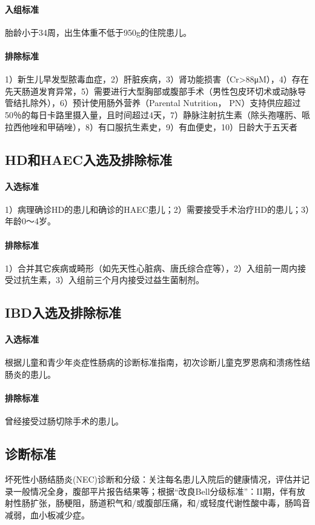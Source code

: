       \paragraph{入组标准}
      胎龄小于34周，出生体重不低于950g的住院患儿。
      \paragraph{排除标准}
      1）新生儿早发型脓毒血症，2）肝脏疾病，3）肾功能损害（Cr>88μM），4）存在先天肠道发育异常，5）需要进行大型胸部或腹部手术（男性包皮环切术或动脉导管结扎除外），6）预计使用肠外营养（Parental Nutrition， PN）支持供应超过50％的每日卡路里摄入量，且时间超过4天，7）静脉注射抗生素（除头孢噻肟、哌拉西他唑和甲硝唑），8）有口服抗生素史，9）有血便史，10）日龄大于五天者
    \subsection{HD和HAEC入选及排除标准}
      \paragraph{入选标准} 1）病理确诊HD的患儿和确诊的HAEC患儿；2）需要接受手术治疗HD的患儿；3）年龄0～4岁。
      \paragraph{排除标准} 1）合并其它疾病或畸形（如先天性心脏病、唐氏综合症等），2）入组前一周内接受过抗生素，3）入组前三个月内接受过益生菌制剂。
    \subsection{IBD入选及排除标准}
      \paragraph{入选标准} 根据儿童和青少年炎症性肠病的诊断标准指南\cite{levine2014espghan}，初次诊断儿童克罗恩病和溃疡性结肠炎的患儿。
      \paragraph{排除标准} 曾经接受过肠切除手术的患儿。
  \subsection{诊断标准}
    坏死性小肠结肠炎(NEC)诊断和分级：关注每名患儿入院后的健康情况，评估并记录一般情况全身，腹部平片报告结果等；根据“改良Bell分级标准”\cite{bell1978neonatal}：II期，伴有放射性肠扩张，肠梗阻，肠道积气和/或腹部压痛，和/或轻度代谢性酸中毒，肠鸣音减弱，血小板减少症。

